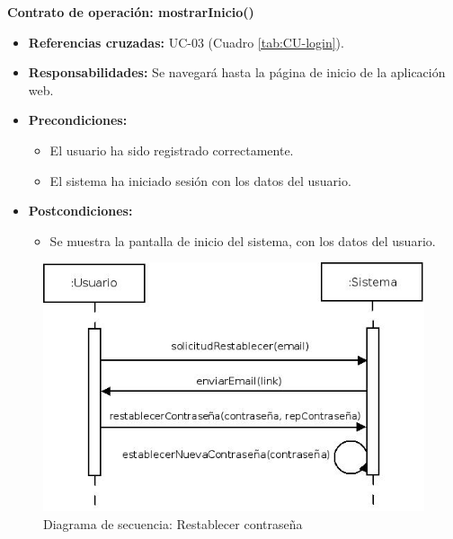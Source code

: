 \textbf{Contrato de operación: mostrarInicio()}
\begin{itemize}
\item \textbf{Referencias cruzadas:} UC-03 (Cuadro \ref{tab:CU-login}).
\item \textbf{Responsabilidades:} Se navegará hasta la página de inicio de la aplicación web.
\item \textbf{Precondiciones:} 
 \begin{itemize}
\item El usuario ha sido registrado correctamente.
\item El sistema ha iniciado sesión con los datos del usuario.
\end {itemize}
\item \textbf{Postcondiciones:} 
 \begin{itemize}
\item Se muestra la pantalla de inicio del sistema, con los datos del usuario.
\end {itemize}
\end {itemize}


\vspace{10mm}

\begin{figure}[H]
\centering
  \includegraphics[scale=.55]{img/secuencias/gestion-usuarios-restablecer-contrasena.jpeg}
  \caption{Diagrama de secuencia: Restablecer contraseña}
  \label{fig:secuencia-gestion-usuarios-restablecer-contrasena}
\end{figure}


